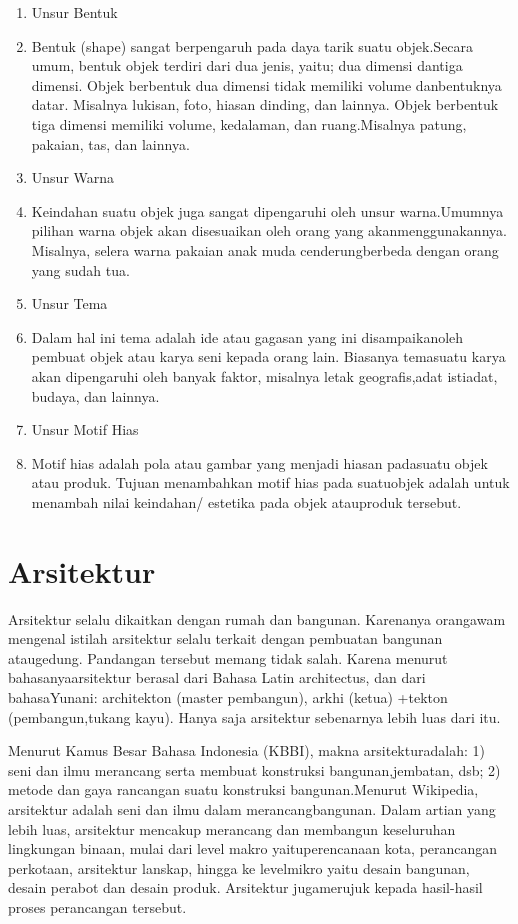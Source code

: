 \documentclass[../manperil.tex]{subfiles}
\begin{document}
\begin{enumerate}

	\item Unsur Bentuk
	\item[] Bentuk (shape) sangat berpengaruh pada daya tarik suatu objek.Secara umum, bentuk objek terdiri dari dua jenis, yaitu; dua dimensi dantiga dimensi. Objek berbentuk dua dimensi tidak memiliki volume danbentuknya datar. Misalnya lukisan, foto, hiasan dinding, dan lainnya. Objek berbentuk tiga dimensi memiliki volume, kedalaman, dan ruang.Misalnya patung, pakaian, tas, dan lainnya.

	\item Unsur Warna
	\item[] Keindahan suatu objek juga sangat dipengaruhi oleh unsur warna.Umumnya pilihan warna objek akan disesuaikan oleh orang yang akanmenggunakannya. Misalnya, selera warna pakaian anak muda cenderungberbeda dengan orang yang sudah tua.


	\item Unsur Tema
	\item[] Dalam hal ini tema adalah ide atau gagasan yang ini disampaikanoleh pembuat objek atau karya seni kepada orang lain. Biasanya temasuatu karya akan dipengaruhi oleh banyak faktor, misalnya letak geografis,adat istiadat, budaya, dan lainnya.

	\item Unsur Motif Hias
	\item[] Motif hias adalah pola atau gambar yang menjadi hiasan padasuatu objek atau produk. Tujuan menambahkan motif hias pada suatuobjek adalah untuk menambah nilai keindahan/ estetika pada objek atauproduk tersebut.
\end{enumerate}


\section{Arsitektur}%
\label{sec:Arsitektur}

Arsitektur selalu dikaitkan dengan rumah dan bangunan. Karenanya orangawam mengenal istilah arsitektur selalu terkait dengan pembuatan bangunan ataugedung. Pandangan tersebut memang tidak salah. Karena menurut bahasanyaarsitektur berasal dari Bahasa Latin architectus, dan dari bahasaYunani: architekton (master pembangun), arkhi (ketua) +tekton (pembangun,tukang kayu). Hanya saja arsitektur sebenarnya lebih luas dari itu.

Menurut Kamus Besar Bahasa Indonesia (KBBI), makna arsitekturadalah: 1) seni dan ilmu merancang serta membuat konstruksi bangunan,jembatan, dsb; 2) metode dan gaya rancangan suatu konstruksi bangunan.Menurut Wikipedia, arsitektur adalah seni dan ilmu dalam merancangbangunan. Dalam artian yang lebih luas, arsitektur mencakup merancang dan membangun keseluruhan lingkungan binaan, mulai dari level makro yaituperencanaan kota, perancangan perkotaan, arsitektur lanskap, hingga ke levelmikro yaitu desain bangunan, desain perabot dan desain produk. Arsitektur jugamerujuk kepada hasil-hasil proses perancangan tersebut.
\end{document}
